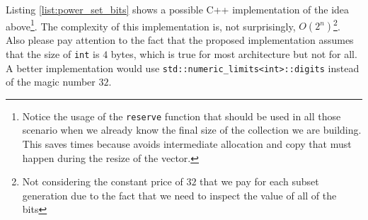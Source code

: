 Listing \ref{list:power_set_bits} shows  a possible C++ implementation of the idea above\footnote{Notice the usage of the \texttt{reserve}
function that should be used in all those scenario when we already know the final size of the
collection we are building. This saves times because avoids intermediate allocation and copy that
must happen during the resize of the vector.}. The complexity of this implementation is, not
surprisingly, $O(2^n)$\footnote{Not considering the constant price of $32$ that we pay for each
subset generation due to the fact that we need to inspect the value of all of the bits}. Also please
pay attention to the fact that the proposed implementation assumes that the size of
\lstinline[columns=fixed]{int} is $4$ bytes, which is true for most architecture but not for all\cite{cit::std::fundamentaltypes}. A better
implementation would use \lstinline[columns=fixed]{std::numeric_limits<int>::digits} instead of
the magic number $32$.


\begin{minipage}{\linewidth}
	
\end{minipage}


